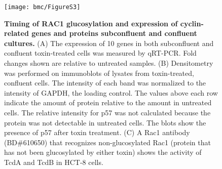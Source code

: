 \begin{figure}[h!]
  \centering
  \texttt{[image: bmc/FigureS3]}
  \caption[Timing of RAC1 glucosylation and expression of cyclin-related genes and proteins 
             subconfluent and confluent cultures.]{
  \textbf{Timing of RAC1 glucosylation and expression of cyclin-related genes and proteins 
             subconfluent and confluent cultures.}
(A) The expression of 10 genes in both subconfluent and confluent toxin-treated cells was measured 
by qRT-PCR. Fold changes shown are relative to untreated samples.
(B) Densitometry was performed on immunoblots of lysates from toxin-treated, confluent cells. The 
intensity of each band was normalized to the intensity of GAPDH, the loading control. The values 
above each row indicate the amount of protein relative to the amount in untreated cells. The relative 
intensity for p57 was not calculated because the protein was not detectable in untreated cells. The 
blots show the presence of p57 after toxin treatment.
(C) A Rac1 antibody (BD\#610650) that recognizes non-glucosylated Rac1 (protein that has not been 
glucosylated by either toxin) shows the activity of TcdA and TcdB in HCT-8 cells. }
  \label{bmc:figs3}
\end{figure}









